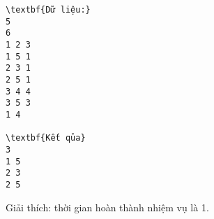 \begin{verbatim}
\textbf{Dữ liệu:}
5
6
1 2 3
1 5 1
2 3 1
2 5 1
3 4 4
3 5 3
1 4

\textbf{Kết qủa}
3
1 5
2 3
2 5
\end{verbatim}

   Giải thích: thời gian hoàn thành nhiệm vụ là 1.